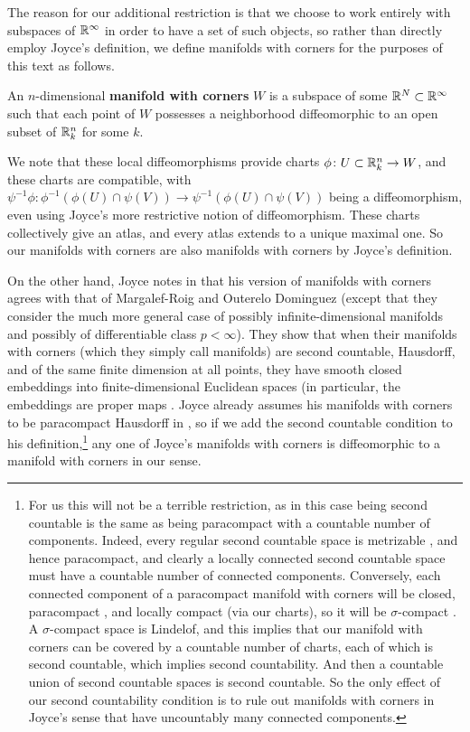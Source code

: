 The reason for our additional restriction is that we choose to work entirely with subspaces of $\mathbb{R}^\infty$ in order to have a set of such objects, so rather than directly employ Joyce's definition, we define manifolds with corners for the purposes of this text as follows.

\begin{definition}\label{D: MWC}
	An $n$-dimensional \textbf{manifold with corners} $W$ is a subspace of some $\mathbb{R}^N \subset \mathbb{R}^\infty$ such that each point of $W$ possesses a neighborhood diffeomorphic to an open subset of $\mathbb{R}^n_k$ for some $k$.
\end{definition}

We note that these local diffeomorphisms provide charts $\phi \colon U \subset \mathbb{R}^n_k \to W$, and these charts are compatible, with $\psi^{-1}\phi \colon \phi^{-1}(\phi(U) \cap \psi(V)) \to \psi^{-1}(\phi(U) \cap \psi(V))$ being a diffeomorphism, even using Joyce's more restrictive notion of diffeomorphism.
These charts collectively give an atlas, and every atlas extends to a unique maximal one.
So our manifolds with corners are also manifolds with corners by Joyce's definition.

On the other hand, Joyce notes in \cite[Remark 2.11 (see also Remark 6.3)]{Joy12} that his version of manifolds with corners agrees with that of Margalef-Roig and Outerelo Dominguez \cite{MaDo92} (except that they consider the much more general case of possibly infinite-dimensional manifolds and possibly of differentiable class $p<\infty$). 
They show that when their manifolds with corners (which they simply call manifolds) are second countable, Hausdorff, and of the same finite dimension at all points, they have smooth closed embeddings into finite-dimensional Euclidean spaces \cite[Corollary 11.3.10]{MaDo92} (in particular, the embeddings are proper maps \cite[Proposition 3.3.4]{MaDo92}.  
Joyce already assumes his manifolds with corners to be paracompact Hausdorff in \cite[Definition 2.1]{Joy12}, so if we add the second countable condition to his definition,\footnote{For us this will not be a terrible restriction, as in this case being second countable is the same as being paracompact with a countable number of components. 
Indeed, every regular second countable space is metrizable \cite[Theorem 34.1]{Mu00}, and hence paracompact, and clearly a locally connected second countable space must have a countable number of connected components. 
Conversely, each connected component of a paracompact manifold with corners will be closed, paracompact \cite[Theorem 41.2]{Mu00}, and locally compact (via our charts), so it will be $\sigma$-compact \cite[Appendix A.1]{Sp79}. 
A $\sigma$-compact space is Lindelof, and this implies that our manifold with corners can be covered by a countable number of charts, each of which is second countable, which implies second countability. 
And then a countable union of second countable spaces is second countable.
So the only effect of our second countability condition is to rule out manifolds with corners in Joyce's sense that have uncountably many connected components.} 
any one of Joyce's manifolds with corners is diffeomorphic to a manifold with corners in our sense.

